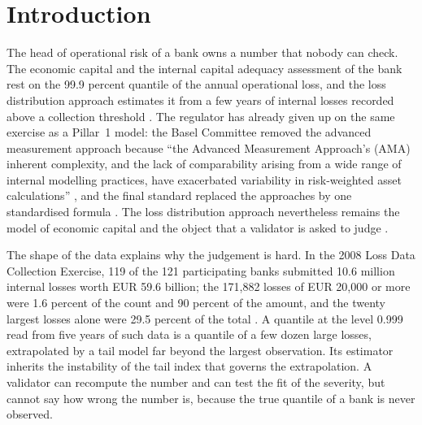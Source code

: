 \section{Introduction}
\label{sec:introduction}

The head of operational risk of a bank owns a number that nobody can check. The economic capital and the internal capital adequacy
assessment of the bank rest on the 99.9 percent quantile of the annual operational loss, and the loss distribution approach estimates it from a
few years of internal losses recorded above a collection threshold \citep{shevchenko2010,cruz2015}. The regulator has already given up
on the same exercise as a Pillar~1 model: the Basel Committee removed the advanced measurement approach because ``the Advanced Measurement Approach's (AMA) inherent
complexity, and the lack of comparability arising from a wide range of internal modelling practices, have exacerbated variability in
risk-weighted asset calculations'' \citep{bcbsd355}, and the final standard replaced the approaches by one standardised formula
\citep{bcbsd424,ope25}. The loss distribution approach nevertheless remains the model of economic capital and the object that a
validator is asked to judge \citep{bcbs196}.

The shape of the data explains why the judgement is hard. In the 2008 Loss Data Collection Exercise, 119 of the 121 participating banks submitted 10.6 million
internal losses worth EUR 59.6 billion; the 171,882 losses of EUR 20,000 or more were 1.6 percent of the count and 90 percent of the amount,
and the twenty largest losses alone were 29.5 percent of the total \citep{bcbs160}. A quantile at the level 0.999 read from five years of such
data is a quantile of a few dozen large losses, extrapolated by a tail model far beyond the largest observation. Its estimator inherits the instability of the tail index that governs the extrapolation. A validator can recompute the number and can test the fit of the
severity, but cannot say how wrong the number is, because the true quantile of a bank is never observed.

